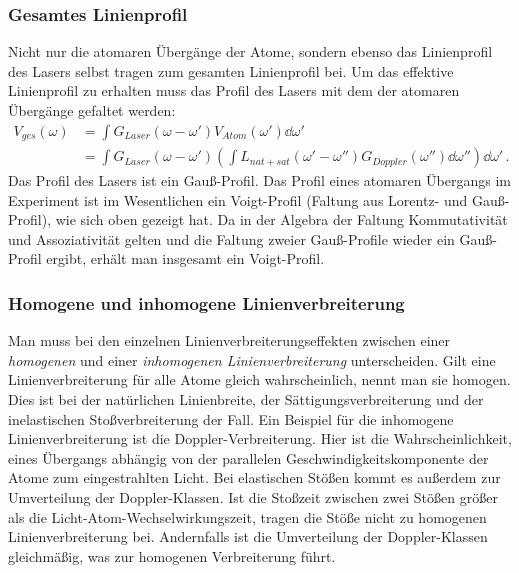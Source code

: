 \subsubsection{Gesamtes Linienprofil}\label{subsubsec:ges-linienprofil}
Nicht nur die atomaren Übergänge der Atome, sondern ebenso das Linienprofil
des Lasers selbst tragen zum gesamten Linienprofil bei. Um das effektive
Linienprofil zu erhalten muss das Profil des Lasers mit dem der atomaren
Übergänge gefaltet werden:
\begin{equation}\label{eq:voigt}
	\begin{split}
		V_{ges}(\omega)
		&=\int{G_{Laser}(\omega-\omega')V_{Atom}(\omega')\dd\omega'}\\
		&=\int{G_{Laser}(\omega-\omega')\left(\int{L_{nat+sat}(\omega'-\omega'')G_{Doppler}(\omega'')\dd\omega''}\right)\dd\omega'}\,.
	\end{split}
\end{equation}
Das Profil des Lasers ist ein Gauß-Profil. Das Profil eines atomaren Übergangs
im Experiment ist im Wesentlichen ein Voigt-Profil (Faltung aus Lorentz- und
Gauß-Profil), wie sich oben gezeigt hat. Da in der Algebra der Faltung
Kommutativität und Assoziativität gelten und die Faltung zweier Gauß-Profile
wieder ein Gauß-Profil ergibt, erhält man insgesamt ein Voigt-Profil.

\subsubsection{Homogene und inhomogene
Linienverbreiterung}\label{subsubsec:homogene_inhomogene_verbreiterung}
Man muss bei den einzelnen Linienverbreiterungseffekten zwischen einer
\textit{homogenen} und einer \textit{inhomogenen Linienverbreiterung}
unterscheiden. Gilt eine Linienverbreiterung für alle Atome gleich
wahrscheinlich, nennt man sie homogen. Dies ist bei der natürlichen
Linienbreite, der Sättigungsverbreiterung und der inelastischen
Stoßverbreiterung der Fall. Ein Beispiel für die inhomogene Linienverbreiterung
ist die Doppler-Verbreiterung. Hier ist die Wahrscheinlichkeit, eines Übergangs
abhängig von der parallelen Geschwindigkeitskomponente der Atome zum
eingestrahlten Licht. Bei elastischen Stößen kommt es außerdem zur Umverteilung
der Doppler-Klassen. Ist die Stoßzeit zwischen zwei Stößen größer als die
Licht-Atom-Wechselwirkungszeit, tragen die Stöße nicht zu homogenen
Linienverbreiterung bei. Andernfalls ist die Umverteilung der Doppler-Klassen
gleichmäßig, was zur homogenen Verbreiterung führt.

